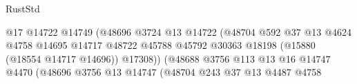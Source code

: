 \begin{lexlean}{RustStd}
\begin{coremodule}
                                                          @17
                                                          @14722
                                                          @14749
                                                          (@48696
                                                            @3724
                                                            @13
                                                            @14722
                                                            (@48704
                                                              @592
                                                              @37
                                                              @13
                                                              @4624
                                                              @4758
                                                              @14695
                                                              @14717
                                                              @48722
                                                              @45788
                                                              @45792
                                                              @30363
                                                              @18198
                                                              (@15880 (@18554 @14717 @14696))
                                                              @17308))
                                                          (@48688
                                                            @3756
                                                            @113
                                                            @13
                                                            @16
                                                            @14747
                                                            @4470
                                                            (@48696
                                                              @3756
                                                              @13
                                                              @14747
                                                              (@48704
                                                                @243
                                                                @37
                                                                @13
                                                                @4487
                                                                @4758

\end{coremodule}
\end{lexlean}
